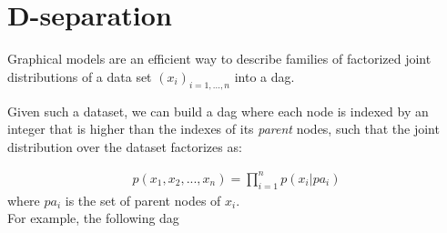 \chapter{D-separation}\label{sec:D-Separation}

Graphical models are an efficient way to describe families of factorized joint distributions of a data set $(x_i)_{i=1,...,n}$ into a \gls{dag}. 

Given such a dataset, we can build a \gls{dag} where each node is indexed by an integer that is higher than the indexes of its \textit{parent} nodes, such that the joint distribution over the dataset factorizes as:

\begin{align}
p(x_1,x_2,...,x_n) = \prod_{i=1}^n p(x_i \vert pa_i)
\end{align}
where $pa_i$ is the set of parent nodes of $x_i$.\\
For example, the following \gls{dag}


